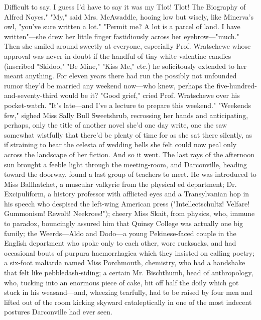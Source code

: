 Difficult to say. I guess I'd have to say it was my Tlot! Tlot! The Biography of
Alfred Noyes."
  "My," said Mrs. McAwaddle, hooing low but wisely, like Minerva's owl, "you've
sure written a lot."
  "Permit me? A lot is a parcel of land. I have written"---she drew her little
finger fastidiously across her eyebrow---"much." Then she smiled around sweetly at
everyone, especially Prof. Wratschewe whose approval was never in doubt if the
handful of tiny white valentine candies (inscribed "Skidoo," "Be Mine," "Kiss
Me," etc.) he solicitously extended to her meant anything. For eleven years
there had run the possibly not unfounded rumor they'd be married any weekend
now---who knew, perhaps the five-hundred-and-seventy-third would be it?
  "Good grief," cried Prof. Wratschewe over his pocket-watch. "It's late---and
I've a lecture to prepare this weekend."
  "Weekends few," sighed Miss Sally Bull Sweetshrub, recrossing her hands and
anticipating, perhaps, only the title of another novel she'd one day write, one
she saw somewhat wistfully that there'd be plenty of time for as she sat there
silently, as if straining to hear the celesta of wedding bells she felt could
now peal only across the landscape of her fiction.
  And so it went.
  The last rays of the afternoon sun brought a feeble light through the
meeting-room, and Darconville, heading toward the doorway, found a last group of
teachers to meet. He was introduced to Miss Ballhatchet, a muscular valkyrie
from the physical ed department; Dr. Excipuliform, a history professor with
afflicted eyes and a Transylvanian hop in his speech who despised the left-wing
American press ("Intellectschultz! Velfare! Gummonism! Rewolt! Neekroes!");
cheery Miss Skait, from physics, who, immune to paradox, bouncingly assured him
that Quinsy College was actually one big family; the Weerds---Aldo and Dodo---a
young Pekinese-faced couple in the English department who spoke only to each
other, wore rucksacks, and had occasional bouts of purpura haemorrhagica which
they insisted on calling poetry; a six-foot maliarda named Miss Porchmouth,
chemistry, who had a handshake that felt like pebbledash-siding; a certain Mr.
Bischthumb, head of anthropology, who, tucking into an enormous piece of cake,
bit off half the doily which got stuck in his weasand---and, wheezing tearfully,
had to be raised by four men and lifted out of the room kicking skyward
cataleptically in one of the most indecent postures Darconville had ever seen.

